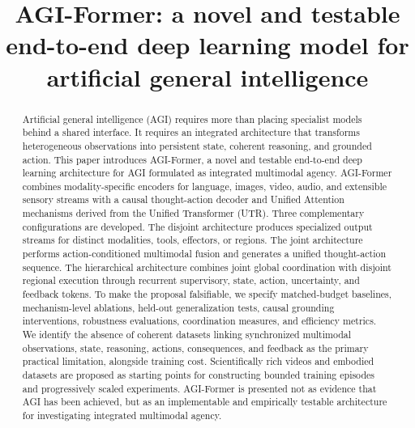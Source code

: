\documentclass[conference]{IEEEtran}
\begin{document}
\title{AGI-Former: a novel and testable end-to-end deep learning model for artificial general intelligence\\
}

\author{
}

\maketitle

\begin{abstract}
Artificial general intelligence (AGI) requires more than placing specialist models behind a shared interface. It requires an integrated architecture that transforms heterogeneous observations into persistent state, coherent reasoning, and grounded action. This paper introduces AGI-Former, a novel and testable end-to-end deep learning architecture for AGI formulated as integrated multimodal agency. AGI-Former combines modality-specific encoders for language, images, video, audio, and extensible sensory streams with a causal thought-action decoder and Unified Attention mechanisms derived from the Unified Transformer (UTR). Three complementary configurations are developed. The disjoint architecture produces specialized output streams for distinct modalities, tools, effectors, or regions. The joint architecture performs action-conditioned multimodal fusion and generates a unified thought-action sequence. The hierarchical architecture combines joint global coordination with disjoint regional execution through recurrent supervisory, state, action, uncertainty, and feedback tokens. To make the proposal falsifiable, we specify matched-budget baselines, mechanism-level ablations, held-out generalization tests, causal grounding interventions, robustness evaluations, coordination measures, and efficiency metrics. We identify the absence of coherent datasets linking synchronized multimodal observations, state, reasoning, actions, consequences, and feedback as the primary practical limitation, alongside training cost. Scientifically rich videos and embodied datasets are proposed as starting points for constructing bounded training episodes and progressively scaled experiments. AGI-Former is presented not as evidence that AGI has been achieved, but as an implementable and empirically testable architecture for investigating integrated multimodal agency.
\end{abstract}
\end{document}
